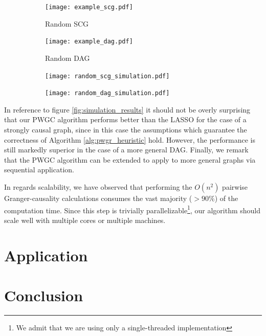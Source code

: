 \documentclass[12pt]{article}
\begin{document}

\begin{figure}
  \centering
  \caption{Simulation Results and Representitive Random Graph Topologies}
  \label{fig:simulation_results}

  \begin{subfigure}[b]{0.45\textwidth}
    \caption{Random SCG}
    \texttt{[image: example\_scg.pdf]}
  \end{subfigure}
  \begin{subfigure}[b]{0.45\textwidth}
    \caption{Random DAG}
    \texttt{[image: example\_dag.pdf]}
  \end{subfigure}

  \begin{subfigure}[b]{0.45\textwidth}
    \texttt{[image: random\_scg\_simulation.pdf]}
  \end{subfigure}
  \begin{subfigure}[b]{0.45\textwidth}
    \texttt{[image: random\_dag\_simulation.pdf]}
  \end{subfigure}
\end{figure}

In reference to figure \ref{fig:simulation_results} it should not be
overly surprising that our PWGC algorithm performs better than the
LASSO for the case of a strongly causal graph, since in this case the
assumptions which guarantee the correctness of Algorithm
\ref{alg:pwgr_heuristic} hold.  However, the performance is still
markedly superior in the case of a more general DAG.  Finally, we
remark that the PWGC algorithm can be extended to apply to more
general graphs via sequential application.

In regards scalability, we have observed that performing the $O(n^2)$
pairwise Granger-causality calculations consumes the vast majority
($> 90\%$) of the computation time.  Since this step is trivially
parallelizable\footnote{We admit that we are using only a
  single-threaded implementation}, our algorithm should scale well
with multiple cores or multiple machines.


\section{Application}
\label{sec:application}
\section{Conclusion}
\label{sec:conclusion}

\printbibliography
\end{document}
